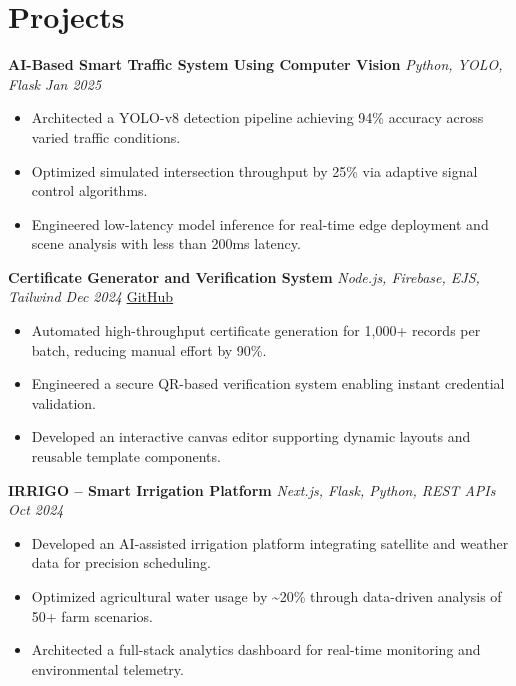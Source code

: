 \documentclass[a4paper,10pt]{article}
\begin{document}
\section*{Projects}

\textbf{AI-Based Smart Traffic System Using Computer Vision} \hfill \textit{Python, YOLO, Flask \quad Jan 2025}
\begin{itemize}
\item Architected a YOLO-v8 detection pipeline achieving 94\% accuracy across varied traffic conditions.
\item Optimized simulated intersection throughput by 25\% via adaptive signal control algorithms.
\item Engineered low-latency model inference for real-time edge deployment and scene analysis with less than 200ms latency.
\end{itemize}

\vspace{2pt}

\textbf{Certificate Generator and Verification System} \hfill \textit{Node.js, Firebase, EJS, Tailwind \quad Dec 2024} \quad \href{https://github.com/your-github/advanced-certificate-generator}{GitHub}
\begin{itemize}
\item Automated high-throughput certificate generation for 1,000+ records per batch, reducing manual effort by 90\%.
\item Engineered a secure QR-based verification system enabling instant credential validation.
\item Developed an interactive canvas editor supporting dynamic layouts and reusable template components.
\end{itemize}

\vspace{2pt}

\textbf{IRRIGO -- Smart Irrigation Platform} \hfill \textit{Next.js, Flask, Python, REST APIs \quad Oct 2024}
\begin{itemize}
\item Developed an AI-assisted irrigation platform integrating satellite and weather data for precision scheduling.
\item Optimized agricultural water usage by \textasciitilde20\% through data-driven analysis of 50+ farm scenarios.
\item Architected a full-stack analytics dashboard for real-time monitoring and environmental telemetry.
\end{itemize}
\end{document}
